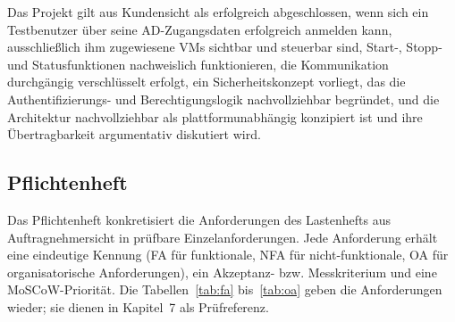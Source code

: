 \documentclass[12pt,a4paper]{article}
\begin{document}
Das Projekt gilt aus Kundensicht als erfolgreich abgeschlossen, wenn sich ein Testbenutzer über seine AD-Zugangsdaten erfolgreich anmelden kann, ausschließlich ihm zugewiesene VMs sichtbar und steuerbar sind, Start-, Stopp- und Statusfunktionen nachweislich funktionieren, die Kommunikation durchgängig verschlüsselt erfolgt, ein Sicherheitskonzept vorliegt, das die Authentifizierungs- und Berechtigungslogik nachvollziehbar begründet, und die Architektur nachvollziehbar als plattformunabhängig konzipiert ist und ihre Übertragbarkeit argumentativ diskutiert wird.

\subsection{Pflichtenheft}
\label{sec:pflichtenheft}

Das Pflichtenheft konkretisiert die Anforderungen des Lastenhefts aus Auftragnehmersicht in prüfbare Einzelanforderungen. Jede Anforderung erhält eine eindeutige Kennung (FA für funktionale, NFA für nicht-funktionale, OA für organisatorische Anforderungen), ein Akzeptanz- bzw. Messkriterium und eine MoSCoW-Priorität. Die Tabellen~\ref{tab:fa} bis~\ref{tab:oa} geben die Anforderungen wieder; sie dienen in Kapitel~7 als Prüfreferenz.
\end{document}
